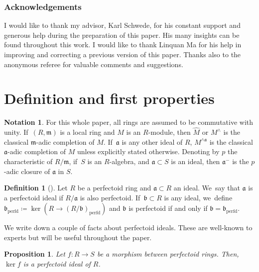 \documentclass[JEP,XML,SOM,Unicode,published]{cedram}
\theoremstyle{plain}
\newtheorem{proposition}[theorem]{Proposition}
\theoremstyle{definition}
\newtheorem{definition}[theorem]{Definition}
\newtheorem{notation}[theorem]{Notation}
\numberwithin{equation}{theorem}
\newcommand{\fra}{\mathfrak{a}}
\newcommand{\frab}{\mathfrak{b}}
\newcommand{\fram}{\mathfrak{m}}
\newcommand{\perfd}{_{\mathrm{perfd}}}
\begin{document}
\subsubsection*{Acknowledgements}
I would like to thank my advisor, Karl Schwede, for his constant support and generous help during the preparation of this paper. His many insights can be found throughout this work. I would like to thank Linquan Ma for his help in improving and correcting a previous version of this paper. Thanks also to the anonymous referee for valuable comments and suggestions.

\section{Definition and first properties}

\begin{notation}
For this whole paper, all rings are assumed to be commutative with unity. If~$(R,\fram)$ is a local ring and $M$ is an $R$\nobreakdash-module, then $\widehat{M}$ or $M^\wedge$ is the classical $\fram$-adic completion of $M$. If~$\fra$ is any other ideal of $R$, $M^{\wedge \fra}$ is the classical $\fra$-adic completion of $M$ unless explicitly stated otherwise. Denoting by $p$ the characteristic of $R/\fram$, if~$S$ is an $R$\nobreakdash-algebra, and $\fra\subset S$ is an ideal, then $\fra^-$ is the $p$-adic closure of $\fra$ in $S$.
\end{notation}


\begin{definition}[{\cite[\S 10]{BhattScholzePrisms}}]\label{definition perfectoidization}
Let $R$ be a perfectoid ring and $\fra\subset R$ an ideal. We~say that $\fra$ is a perfectoid ideal if $R/\fra$ is also perfectoid. If~$\frab\subset R$ is any ideal, we~define $\frab\perfd\coloneqq \ker(R\to (R/\frab)\perfd)$ and $\frab$ is perfectoid if and only if $\frab=\frab\perfd$.
\end{definition}

We write down a couple of facts about perfectoid ideals. These are well-known to experts but will be useful throughout the paper.

\begin{proposition}\label{kernel of map of perfd rings}
Let $f\colon R\to S$ be a morphism between perfectoid rings. Then, $\ker f$ is a perfectoid ideal of $R$.
\end{proposition}
\end{document}
